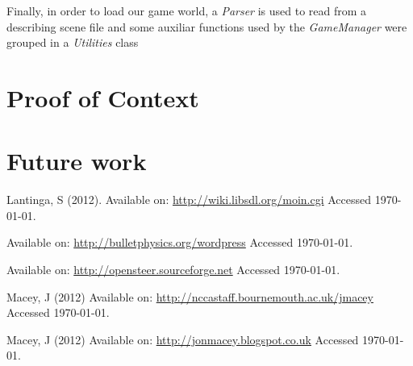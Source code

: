 \documentclass[]{article}
\begin{document}
Finally, in order to load our game world, a \emph{Parser} is used to read from a describing scene file and some auxiliar functions used by the \emph{GameManager} were grouped in a \emph{Utilities} class



\section{Proof of Context}



\section{Future work}







\begin{thebibliography}{}

Lantinga, S (2012).
\newblock Available on:
  \url{http://wiki.libsdl.org/moin.cgi}
\newblock Accessed \today.

\newblock Available on:
  \url{http://bulletphysics.org/wordpress}
\newblock Accessed \today.

\newblock Available on:
  \url{http://opensteer.sourceforge.net}
\newblock Accessed \today.

Macey, J (2012)
\newblock Available on:
  \url{http://nccastaff.bournemouth.ac.uk/jmacey}
\newblock Accessed \today.

Macey, J (2012)
\newblock Available on:
  \url{http://jonmacey.blogspot.co.uk}
\newblock Accessed \today.

\end{thebibliography}
\end{document}
